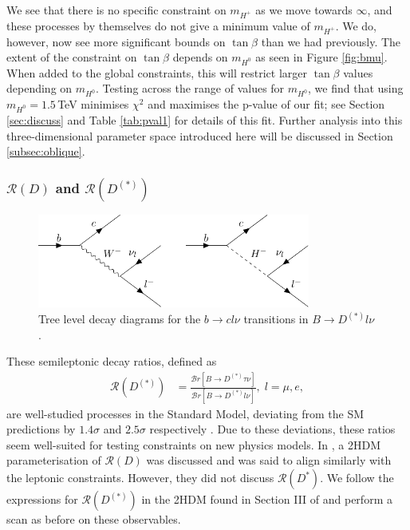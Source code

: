 \documentclass[a4paper,12pt]{article}
\begin{document}
We see that there is no specific constraint on $m_{H^+}$ as we move towards $\infty$, and these processes by themselves do not give a minimum value of $m_{H^+}$. 
We do, however, now see more significant bounds on $\tan\beta$ than we had previously. 
The extent of the constraint on $\tan\beta$ depends on $m_{H^0}$ as seen in Figure \ref{fig:bmu}.
When added to the global constraints, this will restrict larger $\tan\beta$ values depending on $m_{H^0}$.
Testing across the range of values for $m_{H^0}$, we find that using $m_{H^0}=1.5\,$TeV minimises $\chi^2$ and maximises the p-value of our fit; see Section \ref{sec:discuss} and Table \ref{tab:pval1} for details of this fit.
Further analysis into this three-dimensional parameter space introduced here will be discussed in Section \ref{subsec:oblique}.

\subsubsection{$\mathcal{R}(D)$ and $\mathcal{R}(D^{(*)})$}
\begin{figure}[H]
    \centering
    \includegraphics[width=0.8\textwidth]{bclnu.pdf}
    \caption{\label{fig:bclnu}Tree level decay diagrams for the $b\to cl\nu$ transitions in $B\to D^{(*)}l\nu$.}
\end{figure}
These semileptonic decay ratios, defined as
\begin{align}
    \mathcal{R}(D^{(*)}) &=\frac{\mathcal{B}r[B\to D^{(*)}\tau\nu]}{\mathcal{B}r[B\to D^{(*)}l\nu]},\; l = \mu,e,
\end{align}
are well-studied processes in the Standard Model, deviating from the SM predictions by $1.4\sigma$ and $2.5\sigma$ respectively \cite{pdg}. 
Due to these deviations, these ratios seem well-suited for testing constraints on new physics models. 
In \cite{desc}, a 2HDM parameterisation of $\mathcal{R}(D)$ was discussed and was said to align similarly with the leptonic constraints. 
However, they did not discuss $\mathcal{R}(D^*)$. 
We follow the expressions for $\mathcal{R}(D^{(*)})$ in the 2HDM found in Section III of \cite{rds} and perform a scan as before on these observables. 
\end{document}

